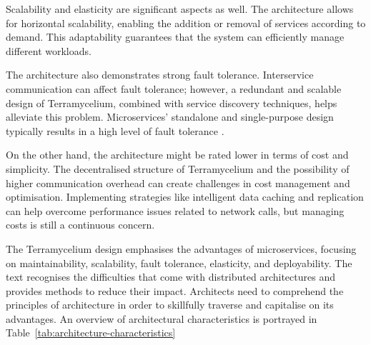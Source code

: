 \documentclass[preprint,12pt]{elsarticle}
\begin{document}
Scalability and elasticity are significant aspects as well. The architecture allows for horizontal scalability, enabling the addition or removal of services according to demand. This adaptability guarantees that the system can efficiently manage different workloads.

The architecture also demonstrates strong fault tolerance. Interservice communication can affect fault tolerance; however, a redundant and scalable design of Terramycelium, combined with service discovery techniques, helps alleviate this problem. Microservices' standalone and single-purpose design typically results in a high level of fault tolerance \cite{MStodaytomorrow}.

On the other hand, the architecture might be rated lower in terms of cost and simplicity. The decentralised structure of Terramycelium and the possibility of higher communication overhead can create challenges in cost management and optimisation. Implementing strategies like intelligent data caching and replication can help overcome performance issues related to network calls, but managing costs is still a continuous concern.

The Terramycelium design emphasises the advantages of microservices, focusing on maintainability, scalability, fault tolerance, elasticity, and deployability. The text recognises the difficulties that come with distributed architectures and provides methods to reduce their impact. Architects need to comprehend the principles of architecture in order to skillfully traverse and capitalise on its advantages. An overview of architectural characteristics is portrayed in Table~\ref{tab:architecture-characteristics}
\end{document}
